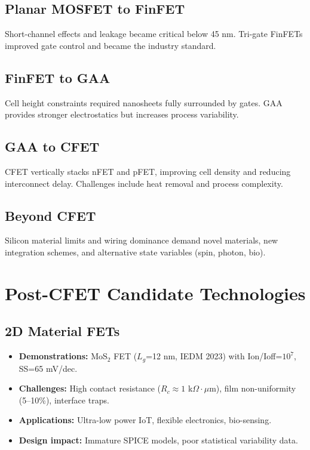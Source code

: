 \documentclass[conference]{IEEEtran}
\begin{document}
\subsection{Planar MOSFET to FinFET}
Short-channel effects and leakage became critical below 45 nm. Tri-gate FinFETs improved gate control and became the industry standard.

\subsection{FinFET to GAA}
Cell height constraints required nanosheets fully surrounded by gates. GAA provides stronger electrostatics but increases process variability.

\subsection{GAA to CFET}
CFET vertically stacks nFET and pFET, improving cell density and reducing interconnect delay. Challenges include heat removal and process complexity.

\subsection{Beyond CFET}
Silicon material limits and wiring dominance demand novel materials, new integration schemes, and alternative state variables (spin, photon, bio).

\section{Post-CFET Candidate Technologies}

\subsection{2D Material FETs}
\begin{itemize}
  \item \textbf{Demonstrations:} MoS$_2$ FET ($L_g$=12 nm, IEDM 2023) with Ion/Ioff=$10^7$, SS=65 mV/dec. 
  \item \textbf{Challenges:} High contact resistance ($R_c \approx 1$ k$\Omega\cdot\mu$m), film non-uniformity (5–10\%), interface traps.  
  \item \textbf{Applications:} Ultra-low power IoT, flexible electronics, bio-sensing.  
  \item \textbf{Design impact:} Immature SPICE models, poor statistical variability data.  
\end{itemize}
\end{document}
